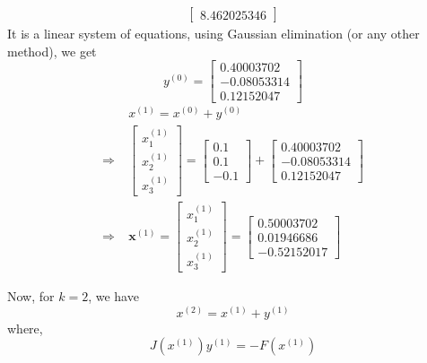 \documentclass[../main-sheet.tex]{subfiles}
\begin{document}
\begin{ex}
\begin{align*}
{\begin{bmatrix*}
            8.462025346
        \end{bmatrix*}}
    \end{align*}
    It is a linear system of equations, using Gaussian elimination (or any other method), we get
    \[
        y^{(0)}=\begin{bmatrix}
        0.40003702\\
        -0.08053314\\
        0.12152047
        \end{bmatrix}
    \]
    \begin{align*}
        & x^{(1)}=x^{(0)}+y^{(0)}\\
        \Rightarrow\; & {\begin{bmatrix}
            x_1^{(1)}\\
            x_2^{(1)}\\
            x_3^{(1)}
        \end{bmatrix}}={\begin{bmatrix}
            0.1\\
            0.1\\
            -0.1
            \end{bmatrix}}+{\begin{bmatrix}
            0.40003702\\
            -0.08053314\\
            0.12152047
            \end{bmatrix}}\\
        \Rightarrow\; & \mathbf{x}^{(1)}= {\begin{bmatrix}
            x_1^{(1)}\\
            x_2^{(1)}\\
            x_3^{(1)}
        \end{bmatrix}}={\begin{bmatrix}
            0.50003702\\
            0.01946686\\
            -0.52152017
            \end{bmatrix}}
    \end{align*}
    \begin{note}
        Now, for \(k=2\), we have
        \begin{equation}
            {x}^{(2)}={x}^{(1)}+{y}^{(1)}
        \label{eq:newtonNL5}
    \end{equation}
    where, 
    \begin{equation}
        J\left( x^{(1)} \right)y^{(1)}=-F\left( x^{(1)} \right)

\end{equation}
\end{note}
\end{ex}
\end{document}
